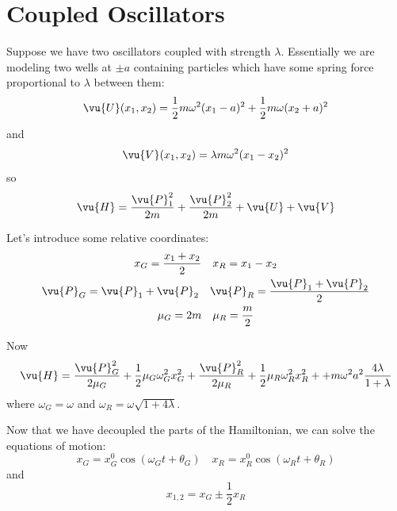 \documentclass[a4paper,twoside,master.tex]{subfiles}
\begin{document}
\section{Coupled Oscillators}
\label{sec:coupled_oscillators}

Suppose we have two oscillators coupled with strength $ \lambda $. Essentially we are modeling two wells at $ \pm a $ containing particles which have some spring force proportional to $ \lambda $ between them:
\begin{equation}
    \vu{U}(x_1,x_2) = \frac{1}{2} m \omega^2 (x_1-a)^2 + \frac{1}{2} m \omega (x_2+a)^2
\end{equation}
and
\begin{equation}
    \vu{V}(x_1, x_2) = \lambda m \omega^2 (x_1-x_2)^2
\end{equation}
so
\begin{equation}
    \vu{H} = \frac{ \vu{P}_1^2}{2m} + \frac{ \vu{P}_2^2}{2m} + \vu{U} + \vu{V}
\end{equation}

Let's introduce some relative coordinates:
\begin{gather}
    x_G = \frac{x_1+x_2}{2} \quad x_R = x_1-x_2 \\
    \vu{P}_G = \vu{P}_1 + \vu{P}_2 \quad \vu{P}_R = \frac{ \vu{P}_1 + \vu{P}_2}{2} \\
    \mu_G = 2m \quad \mu_R = \frac{m}{2}
\end{gather}

Now
\begin{equation}
    \vu{H} = \frac{ \vu{P}_G^2}{2 \mu_G} + \frac{1}{2} \mu_G \omega_G^2 x_G^2 + \frac{ \vu{P}_R^2}{2 \mu_R} + \frac{1}{2} \mu_R \omega_R^2 x_R^2 + + m \omega^2 a^2 \frac{4 \lambda}{1 + \lambda}
\end{equation}
where $ \omega_G = \omega $ and $ \omega_R = \omega \sqrt{1+4 \lambda} $.

Now that we have decoupled the parts of the Hamiltonian, we can solve the equations of motion:
\begin{equation}
    x_G = x_G^0 \cos(\omega_G t + \theta_G) \quad x_R = x_R^0 \cos(\omega_R t + \theta_R)
\end{equation}
and
\begin{equation}
    x_{1,2} = x_G \pm \frac{1}{2} x_R
\end{equation}
\end{document}
